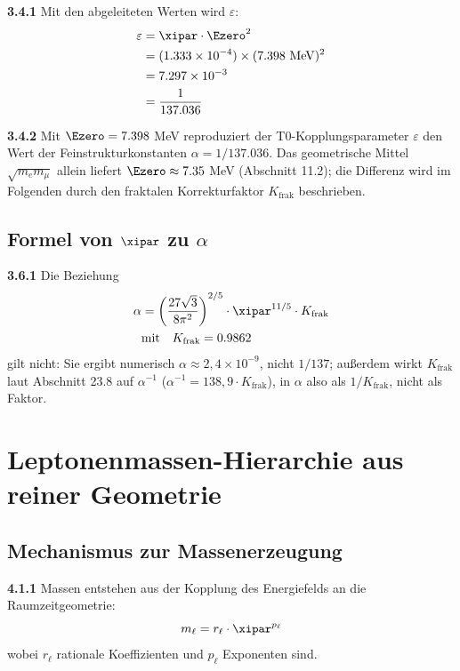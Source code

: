 	\noindent \textbf{3.4.1} Mit den abgeleiteten Werten wird $\varepsilon$:
	\begin{align}
		\varepsilon &= \xipar \cdot \Ezero^2 \\
		&= (1.333 \times 10^{-4}) \times (7.398 \text{ MeV})^2 \\
		&= 7.297 \times 10^{-3} \\
		&= \frac{1}{137.036}
		\label{eq:epsilon_numerical}
	\end{align}
	
	\begin{tcolorbox}[colback=blue!5!white,colframe=blue!75!black,title=Vergleich mit der Feinstrukturkonstanten]
		\textbf{3.4.2} Mit $\Ezero = 7.398$ MeV reproduziert der T0-Kopplungsparameter $\varepsilon$ den Wert der Feinstrukturkonstanten $\alpha = 1/137.036$. Das geometrische Mittel $\sqrt{m_e m_\mu}$ allein liefert $\Ezero \approx 7.35$ MeV (Abschnitt 11.2); die Differenz wird im Folgenden durch den fraktalen Korrekturfaktor $K_{\text{frak}}$ beschrieben.
	\end{tcolorbox}

	\subsection{Formel von $\xipar$ zu $\alpha$}
	
	\noindent \textbf{3.6.1} Die Beziehung
	\begin{align}
		\alpha &= \left( \frac{27 \sqrt{3}}{8 \pi^2} \right)^{2/5} \cdot \xipar^{11/5} \cdot K_{\text{frak}} \\
		&\text{mit} \quad K_{\text{frak}} = 0.9862
	\end{align}
	gilt nicht: Sie ergibt numerisch $\alpha \approx 2{,}4\times10^{-9}$, nicht $1/137$; außerdem wirkt $K_{\text{frak}}$ laut Abschnitt 23.8 auf $\alpha^{-1}$ ($\alpha^{-1} = 138{,}9\cdot K_{\text{frak}}$), in $\alpha$ also als $1/K_{\text{frak}}$, nicht als Faktor.

	\section{Leptonenmassen-Hierarchie aus reiner Geometrie}
	
	\subsection{Mechanismus zur Massenerzeugung}
	
	\noindent \textbf{4.1.1} Massen entstehen aus der Kopplung des Energiefelds an die Raumzeitgeometrie:
	\begin{equation}
		m_{\ell} = r_{\ell} \cdot \xipar^{p_{\ell}}
	\end{equation}
	wobei $r_{\ell}$ rationale Koeffizienten und $p_{\ell}$ Exponenten sind.
	
